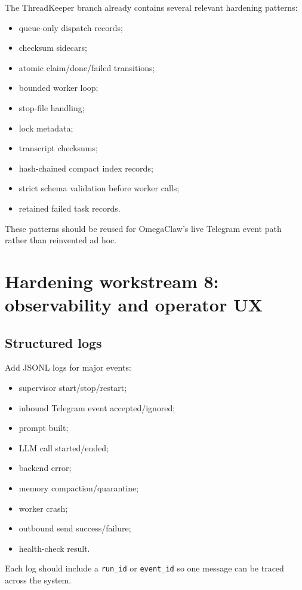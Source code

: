 \documentclass[11pt]{article}
\begin{document}
The ThreadKeeper branch already contains several relevant hardening patterns:

\begin{itemize}
  \item queue-only dispatch records;
  \item checksum sidecars;
  \item atomic claim/done/failed transitions;
  \item bounded worker loop;
  \item stop-file handling;
  \item lock metadata;
  \item transcript checksums;
  \item hash-chained compact index records;
  \item strict schema validation before worker calls;
  \item retained failed task records.
\end{itemize}

These patterns should be reused for OmegaClaw's live Telegram event path rather than reinvented ad hoc.

\section{Hardening workstream 8: observability and operator UX}

\subsection{Structured logs}

Add JSONL logs for major events:

\begin{itemize}
  \item supervisor start/stop/restart;
  \item inbound Telegram event accepted/ignored;
  \item prompt built;
  \item LLM call started/ended;
  \item backend error;
  \item memory compaction/quarantine;
  \item worker crash;
  \item outbound send success/failure;
  \item health-check result.
\end{itemize}

Each log should include a \texttt{run\_id} or \texttt{event\_id} so one message can be traced across the system.
\end{document}
